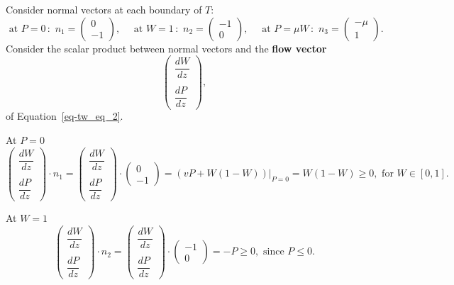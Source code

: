 \documentclass[
  letterpaper,
  DIV=11,
  numbers=noendperiod]{scrreprt}
\theoremstyle{definition}
\theoremstyle{plain}
\theoremstyle{plain}
\theoremstyle{remark}
\begin{document}
Consider normal vectors at each boundary of \(T\): \[
\text{ at } P = 0 \, : \, \, n_1 = \begin{pmatrix} 
0 \\ -1
\end{pmatrix}, \quad 
\text{ at } W= 1 \, : \, \, n_2 = \begin{pmatrix} 
-1\\ 0
\end{pmatrix}, \quad 
\text{ at } P = \mu W \, : \, \, n_3 = \begin{pmatrix} 
-\mu \\1
\end{pmatrix}.
\] Consider the scalar product between normal vectors and the
\textbf{flow vector} \[
\begin{pmatrix} 
\dfrac{ dW}{dz} \\ \\  \dfrac{dP}{dz}
\end{pmatrix},
\] of Equation~\ref{eq-tw_eq_2}.

At \(P=0\) \[
\begin{pmatrix} 
\dfrac{ dW}{dz} \\  \\ \dfrac{dP}{dz}
\end{pmatrix} \cdot n_1 = \begin{pmatrix} 
\dfrac{ dW}{dz} \\  \\ \dfrac{dP}{dz}
\end{pmatrix}\cdot  \begin{pmatrix} 
0 \\ -1
\end{pmatrix} =  \left(v P + W(1-W)\right) \Big|_{P=0} =  W(1-W) \geq 0 , \text{ for } W\in [0,1].
\]

At \(W=1\) \[
\begin{pmatrix} 
\dfrac{ dW}{dz} \\  \\ \dfrac{dP}{dz}
\end{pmatrix} \cdot n_2 = \begin{pmatrix} 
\dfrac{ dW}{dz} \\  \\ \dfrac{dP}{dz}
\end{pmatrix}\cdot  \begin{pmatrix} 
-1 \\ 0
\end{pmatrix} =  -P  \geq 0 , \text{ since }P \leq 0.
\]
\end{document}
